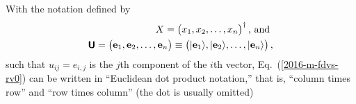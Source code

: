 With the notation
defined by
\begin{equation}
\begin{split} X = \begin{pmatrix}
x_1, x_2, \ldots , x_n
\end{pmatrix}^\dagger
\textrm{, and }
\\
\textsf{\textbf{U}} =
\begin{pmatrix}{\bf e}_1,{\bf e}_2, \ldots , {\bf e}_n\end{pmatrix}
\equiv
\begin{pmatrix} \vert {\bf e}_1\rangle ,\vert {\bf e}_2 \rangle ,  \ldots , \vert {\bf e}_n\rangle \end{pmatrix}
,
\label{2016-m-fdvs-not}
\end{split}
\end{equation}
such that  $u_{ij} = e_{i,j}$ is the $j$th component of the $i$th vector,
Eq.~(\ref{2016-m-fdvs-rv0}) can be written
in ``Euclidean dot product notation,''
that is,
``column times row''
and
``row times column'' (the dot is usually omitted)
